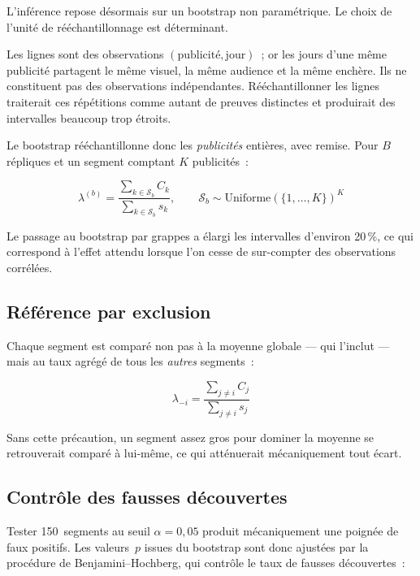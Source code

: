 \documentclass[11pt,a4paper]{article}
\begin{document}
L'inférence repose désormais sur un bootstrap non paramétrique. Le choix de
l'unité de rééchantillonnage est déterminant.

Les lignes sont des observations $(\text{publicité},\text{jour})$~; or les jours
d'une même publicité partagent le même visuel, la même audience et la même
enchère. Ils ne constituent pas des observations indépendantes. Rééchantillonner
les lignes traiterait ces répétitions comme autant de preuves distinctes et
produirait des intervalles beaucoup trop étroits.

Le bootstrap rééchantillonne donc les \emph{publicités} entières, avec remise.
Pour $B$ répliques et un segment comptant $K$ publicités~:

\begin{equation}
  \lambda^{(b)} = \frac{\sum_{k \in \mathcal{S}_b} C_k}
                       {\sum_{k \in \mathcal{S}_b} s_k},
  \qquad
  \mathcal{S}_b \sim \text{Uniforme}(\{1,\dots,K\})^{K}
\end{equation}

Le passage au bootstrap par grappes a élargi les intervalles d'environ 20\,\%,
ce qui correspond à l'effet attendu lorsque l'on cesse de sur-compter des
observations corrélées.

\subsection{Référence par exclusion}

Chaque segment est comparé non pas à la moyenne globale --- qui l'inclut --- mais
au taux agrégé de tous les \emph{autres} segments~:

\begin{equation}
  \lambda_{-i} = \frac{\sum_{j \neq i} C_j}{\sum_{j \neq i} s_j}
\end{equation}

Sans cette précaution, un segment assez gros pour dominer la moyenne se
retrouverait comparé à lui-même, ce qui atténuerait mécaniquement tout écart.

\subsection{Contrôle des fausses découvertes}

Tester 150~segments au seuil $\alpha = 0{,}05$ produit mécaniquement une
poignée de faux positifs. Les valeurs~$p$ issues du bootstrap sont donc
ajustées par la procédure de Benjamini--Hochberg, qui contrôle le taux de
fausses découvertes~:
\end{document}
